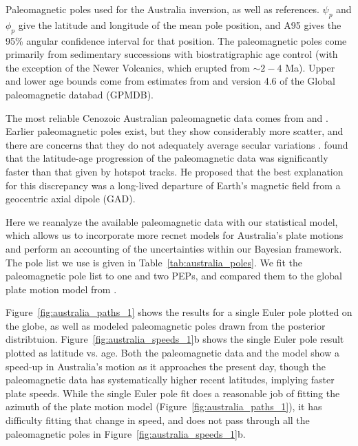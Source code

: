 \documentclass[preprint,12pt,authoryear]{elsarticle}
\begin{document}
\begin{table}
\scriptsize

\caption[Paleomagnetic poles used for the Australia inversion.]{Paleomagnetic poles used for the Australia inversion, as well as references. 
$\psi_p$ and $\phi_p$ give the latitude and longitude of the mean pole position, and A95 gives the 95\% angular confidence interval for that position.
The paleomagnetic poles come primarily from sedimentary successions with biostratigraphic age control 
(with the exception of the Newer Volcanics, which erupted from $\sim2-4$ Ma).
Upper and lower age bounds come from estimates from \citet{idnurm1985lateI} and version 4.6 of the Global paleomagnetic databad (GPMDB). }
\label{tab:australia_poles}
\end{table}

The most reliable Cenozoic Australian paleomagnetic data comes from \citet{idnurm1985lateI} and \citet{idnurm1994new}.
Earlier paleomagnetic poles exist, but they show considerably more scatter,
and there are concerns that they do not adequately average secular variations
\citep{idnurm1985lateI, klootwijk2009sedimentary}.
\citet{idnurm1985lateII} found that the latitude-age progression of the paleomagnetic
data was significantly faster than that given by hotspot tracks.
He proposed that the best explanation for this discrepancy was a long-lived
departure of Earth's magnetic field from a geocentric axial dipole (GAD).

Here we reanalyze the available paleomagnetic data with our statistical model,
which allows us to incorporate more recnet models for Australia's plate motions
and perform an accounting of the uncertainties within our Bayesian framework.
The pole list we use is given in Table~\ref{tab:australia_poles}.
We fit the paleomagnetic pole list to one and two PEPs, and compared them
to the global plate motion model from \citet{seton2012global}.

Figure~\ref{fig:australia_paths_1} shows the results for a single Euler pole
plotted on the globe, as well as modeled paleomagnetic poles drawn from the posterior distribtuion. 
Figure~\ref{fig:australia_speeds_1}b shows the single Euler pole result plotted as latitude vs. age.
Both the paleomagnetic data and the \citet{seton2012global} model show a speed-up in
Australia's motion as it approaches the present day, though the paleomagnetic data
has systematically higher recent latitudes, implying faster plate speeds.
While the single Euler pole fit does a reasonable job of fitting the azimuth of the plate motion model 
(Figure~\ref{fig:australia_paths_1}), it has difficulty fitting that change in speed, 
and does not pass through all the paleomagnetic poles in Figure~\ref{fig:australia_speeds_1}b.
\end{document}
